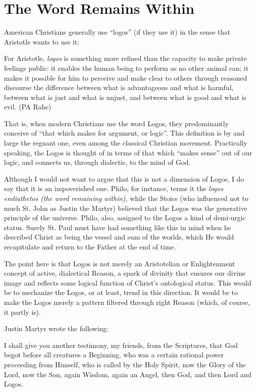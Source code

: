 \section{The Word Remains Within}

American Christians generally use ``logos'' (if they use it) in the sense that Aristotle wants to use it:

\begin{quotex}
For Aristotle, \emph{logos} is something more refined than the capacity to make private feelings public: it enables the human being to perform as no other animal can; it makes it possible for him to perceive and make clear to others through reasoned discourse the difference between what is advantageous and what is harmful, between what is just and what is unjust, and between what is good and what is evil. (PA Rahe)
\end{quotex}


That is, when modern Christians use the word Logos, they predominantly conceive of ``that which makes for argument, or logic''. This definition is by and large the regnant one, even among the classical Christian movement. Practically speaking, the Logos is thought of in terms of that which ``makes sense'' out of our logic, and connects us, through dialectic, to the mind of God.

Although I would not want to argue that this is not a dimension of Logos, I do say that it is an impoverished one. Philo, for instance, terms it the \emph{logos endiathetos (the word remaining within),} while the Stoics (who influenced not to much St. John as Justin the Martyr) believed that the Logos was the generative principle of the universe. Philo, also, assigned to the Logos a kind of demi-urgic status. Surely St. Paul must have had something like this in mind when he described Christ as being the vessel and sum of the worlds, which He would recapitulate and return to the Father at the end of time.

The point here is that Logos is not merely an Aristotelian or Enlightenment concept of active, dialectical Reason, a spark of divinity that ensures our divine image and reflects some logical function of Christ's ontological status. This would be to mechanize the Logos, or at least, trend in this direction. It would be to make the Logos merely a pattern filtered through right Reason (which, of course, it partly is).

Justin Martyr wrote the following:

\begin{quotex}
I shall give you another testimony, my friends, from the Scriptures, that God begot before all creatures a Beginning, who was a certain rational power proceeding from Himself, who is called by the Holy Spirit, now the Glory of the Lord, now the Son, again Wisdom, again an Angel, then God, and then Lord and Logos.
\end{quotex}


